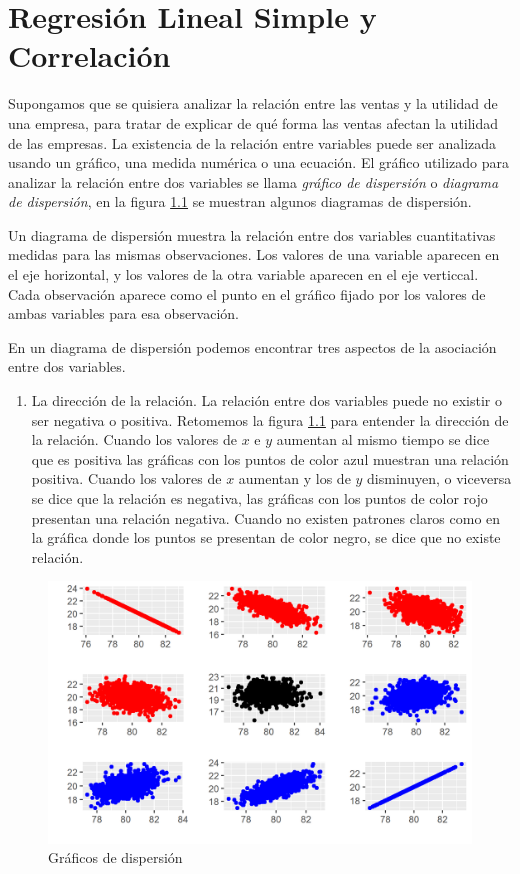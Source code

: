 \documentclass[]{book}
\providecommand{\tightlist}{%
  \setlength{\itemsep}{0pt}\setlength{\parskip}{0pt}}
\begin{document}
\hypertarget{methods}{%
\chapter{Regresión Lineal Simple y Correlación}\label{methods}}

Supongamos que se quisiera analizar la relación entre las ventas y la utilidad de una empresa, para tratar de explicar de qué forma las ventas afectan la utilidad de las empresas. La existencia de la relación entre variables puede ser analizada usando un gráfico, una medida numérica o una ecuación.
El gráfico utilizado para analizar la relación entre dos variables se llama \emph{gráfico de dispersión} o \emph{diagrama de dispersión}, en la figura \ref{fig:corr} se muestran algunos diagramas de dispersión.

Un diagrama de dispersión muestra la relación entre dos variables cuantitativas medidas para las mismas observaciones. Los valores de una variable aparecen en el eje horizontal, y los valores de la otra variable aparecen en el eje verticcal. Cada observación aparece como el punto en el gráfico fijado por los valores de ambas variables para esa observación.

En un diagrama de dispersión podemos encontrar tres aspectos de la asociación entre dos variables.

\begin{enumerate}
\def\labelenumi{\arabic{enumi}.}
\tightlist
\item
  La dirección de la relación. La relación entre dos variables puede no existir o ser negativa o positiva. Retomemos la figura \ref{fig:corr} para entender la dirección de la relación. Cuando los valores de \(x\) e \(y\) aumentan al mismo tiempo se dice que es positiva las gráficas con los puntos de color azul muestran una relación positiva. Cuando los valores de \(x\) aumentan y los de \(y\) disminuyen, o viceversa se dice que la relación es negativa, las gráficas con los puntos de color rojo presentan una relación negativa. Cuando no existen patrones claros como en la gráfica donde los puntos se presentan de color negro, se dice que no existe relación.
\end{enumerate}

\begin{figure}[h]

{\centering \includegraphics[width=0.5\linewidth]{corr} 

}

\caption{Gráficos de dispersión}\label{fig:corr}
\end{figure}
\end{document}

